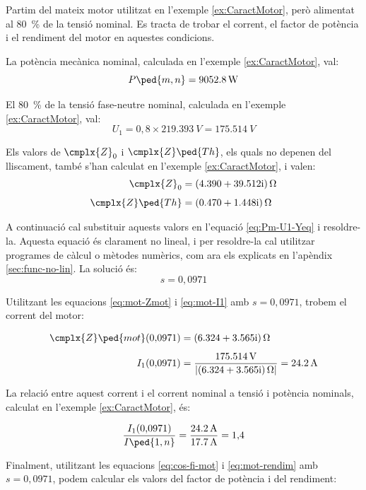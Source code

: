 	
\begin{exemple}\label{ex:MotTensRedSolAp}
	\addcontentsxms{\MotTensRedSolAp}	
	Partim del mateix motor utilitzat en l'exemple \vref{ex:CaractMotor}, però alimentat al \qty{80}{\%} de la tensió nominal. Es tracta de trobar el corrent, el factor de potència i el rendiment del motor en aquestes condicions.
	
	La potència mecànica nominal, calculada  en l'exemple \ref{ex:CaractMotor}, val: \[
	P\ped{m,n} = \qty{9052,8}{W}
	\]
	
	El \qty{80}{\%} de la tensió fase-neutre nominal, calculada  en l'exemple \ref{ex:CaractMotor}, val:
	\[
	U_1 = 0{,}8\times\qty{219,393}{V} = \qty{175,514}{V}
	\]
	
	Els valors de $\cmplx{Z}_0$ i  $\cmplx{Z}\ped{Th}$, els quals no depenen del lliscament, també s'han calculat en  l'exemple \ref{ex:CaractMotor}, i valen:
	\begin{align*}
	\cmplx{Z}_0 &=  \complexqty{4,390+j39,512}{\ohm} \\[1ex]
	\cmplx{Z}\ped{Th} &= \complexqty{0,470+j1,448}{\ohm} 
	\end{align*}
	
	A continuació cal substituir aquests valors en l'equació \eqref{eq:Pm-U1-Yeq} i resoldre-la. Aquesta equació és clarament no lineal, i per  resoldre-la cal utilitzar programes de càlcul o mètodes numèrics, com ara els explicats en l'apèndix \ref{sec:func-no-lin}. La solució és:
	\[
	s = 0{,}0971
	\]
	
	Utilitzant les equacions \eqref{eq:mot-Zmot} i \eqref{eq:mot-I1} amb $s  = 0{,}0971$, trobem el corrent del motor:
	
	\begin{align*}
	\cmplx{Z}\ped{mot}(0{,}0971) &=  \complexqty{6,324+j3,565}{\ohm} \\[1ex]
	I_1(0{,}0971) &= \frac{\qty{175,514}{V}}{|\complexqty{6,324+j3,565}{\ohm}|} = \qty{24,2}{A}
	\end{align*}
	
	La relació entre aquest  corrent i el corrent nominal a tensió i potència nominals, calculat en l'exemple \ref{ex:CaractMotor}, és:
	
	\[
	\frac{I_1(0{,}0971)}{I\ped{1,n}} = \frac{\qty{24,2}{A}}{\qty{17,7}{A}} = 1{,}4
	\]
	
	Finalment, utilitzant les equacions  \eqref{eq:cos-fi-mot} i \eqref{eq:mot-rendim} amb $s  = 0{,}0971$, podem calcular els valors del factor de potència i del rendiment:
	

\end{exemple}

